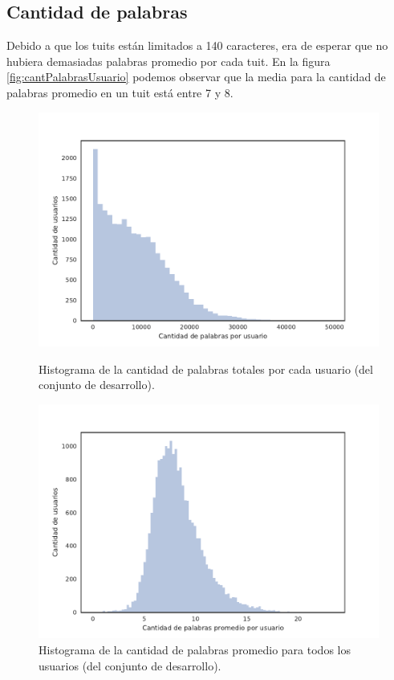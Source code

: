 \subsection{Cantidad de palabras}
Debido a que los tuits están limitados a 140 caracteres, era de esperar que no hubiera demasiadas palabras promedio por cada tuit. En la figura \ref{fig:cantPalabrasUsuario} podemos observar que la media para la cantidad de palabras promedio en un tuit está entre 7 y 8.
\begin{figure}[!ht]\centering
  \begin{minipage}{0.49\textwidth}
    \includegraphics[width=\linewidth]{./images/train/conFiltro/cantPalabrasUsuario.pdf}
    \caption{Histograma de la cantidad de palabras totales por cada usuario (del conjunto de desarrollo).} 
    \label{fig:cantPalabrasUsuario} 
   \end{minipage}
   \begin{minipage}{0.49\textwidth}
    \includegraphics[width=\linewidth]{./images/train/conFiltro/cantPalabrasPromedio.pdf}
    \caption{Histograma de la cantidad de palabras promedio para todos los usuarios (del conjunto de desarrollo).} 
    \label{fig:cantPalabrasPromedio} 
   \end{minipage}
   
\end{figure}

